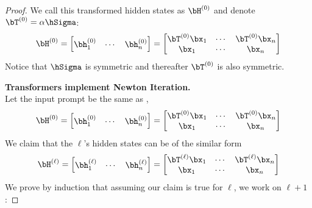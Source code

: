 \begin{proof}
We call this transformed hidden states as $\bH^{(0)}$ and denote $\bT^{(0)} = \alpha \hSigma$:
\begin{equation}
        \bH^{(0)} = \begin{bmatrix}
            \bh_1^{(0)} & \cdots & \bh_n^{(0)}
        \end{bmatrix} = \begin{bmatrix}
            \bT^{(0)} \bx_1 & \cdots & \bT^{(0)} \bx_n \\
            \bx_1 & \cdots & \bx_n
        \end{bmatrix} 
\label{eqn:input_prompt}
\end{equation}
Notice that $\hSigma$ is symmetric and thereafter $\bT^{(0)}$ is also symmetric.

\textbf{Transformers implement Newton Iteration.} \\
Let the input prompt be the same as , 
    \begin{equation}
        \bH^{(0)} = \begin{bmatrix}
            \bh_1^{(0)} & \cdots & \bh_n^{(0)}
        \end{bmatrix} = \begin{bmatrix}
            \bT^{(0)} \bx_1 & \cdots & \bT^{(0)} \bx_n \\
            \bx_1 & \cdots & \bx_n
        \end{bmatrix} 
    \end{equation}
    We claim that the $\ell$'s hidden states can be of the similar form 
    \begin{equation}
        \bH^{(\ell)} = \begin{bmatrix}
            \bh_1^{(\ell)} & \cdots & \bh_n^{(\ell)}
        \end{bmatrix} = \begin{bmatrix}
            \bT^{(\ell)} \bx_1 & \cdots & \bT^{(\ell)} \bx_n \\
            \bx_1 & \cdots & \bx_n
        \end{bmatrix} 
    \end{equation}
    We prove by induction that assuming our claim is true for $\ell$, we work on $\ell + 1$:


\end{proof}

